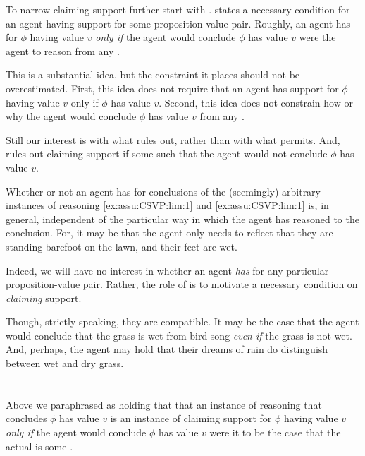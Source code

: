 \begin{note}[Support]
  To narrow claiming support further start with \support{}.
  \ideaS{} states a necessary condition for an agent having support for some proposition-value pair.
  Roughly, an agent has \support{} for \(\phi\) having value \(v\) \emph{only if} the agent would conclude \(\phi\) has value \(v\) were the agent to reason from any .

  \hozline

  This is a substantial idea, but the constraint it places should not be overestimated.
  First, this idea does not require that an agent has support for \(\phi\) having value \(v\) only if \(\phi\) has value \(v\).
  Second, this idea does not constrain how or why the agent would conclude \(\phi\) has value \(v\) from any .

  Still our interest is with what \ideaS{} rules out, rather than with what \ideaS{} permits.
  And, \ideaS{} rules out claiming support if some \epPW{} such that the agent would not conclude \(\phi\) has value \(v\).

  Whether or not an agent has \support{} for conclusions of the (seemingly) arbitrary instances of reasoning \ref{ex:assu:CSVP:lim:1} and \ref{ex:assu:CSVP:lim:1} is, in general, independent of the particular way in which the agent has reasoned to the conclusion.
  For, it may be that the agent only needs to reflect that they are standing barefoot on the lawn, and their feet are wet.
\end{note}

\begin{note}
  Indeed, we will have no interest in whether an agent \emph{has}  for any particular proposition-value pair.
  Rather, the role of \ideaS{} is to motivate a necessary condition on \emph{claiming} support.

  \hozline

  Though, strictly speaking, they are compatible.
  It may be the case that the agent would conclude that the grass is wet from bird song \emph{even if} the grass is not wet.
  And, perhaps, the agent may hold that their dreams of rain do distinguish between wet and dry grass.
\end{note}

\section{}
\label{sec:ideaS}

\begin{note}
  Above we paraphrased \ideaS{} as holding that that an instance of reasoning that concludes \(\phi\) has value \(v\) is an instance of claiming support for \(\phi\) having value \(v\) \emph{only if} the agent would conclude \(\phi\) has value \(v\) were it to be the case that the actual \world{} is some \epPW{}.
\end{note}



